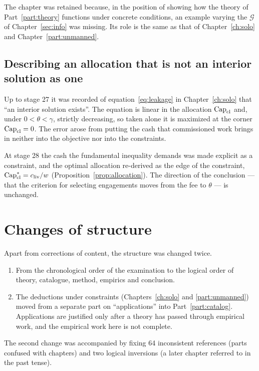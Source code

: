 The chapter was retained because, in the position of showing how the theory of
Part~\ref{part:theory} functions under concrete conditions, an example varying the $\mathcal{G}$ of
Chapter~\ref{sec:info} was missing. Its role is the same as that of Chapter~\ref{ch:solo} and
Chapter~\ref{part:unmanned}.

\subsection{Describing an allocation that is not an interior solution as one}
\label{sec:rev-interior}

Up to stage 27 it was recorded of equation~\eqref{eq:leakage} in Chapter~\ref{ch:solo} that ``an
interior solution exists''. The equation is linear in the allocation $\mathrm{Cap}_{\mathrm{cl}}$ and, under
$0<\theta<\gamma$, strictly decreasing, so taken alone it is maximized at the corner $\mathrm{Cap}_{\mathrm{cl}}=0$. The
error arose from putting the cash that commissioned work brings in neither into the objective nor
into the constraints.

At stage 28 the cash the fundamental inequality demands was made explicit as a constraint, and the
optimal allocation re-derived as the edge of the constraint,
$\mathrm{Cap}_{\mathrm{cl}}^\ast=c_{\rm liv}/w$ (Proposition~\ref{prop:allocation}). The direction of the conclusion —
that the criterion for selecting engagements moves from the fee to $\theta$ — is unchanged.

\section{Changes of structure}

Apart from corrections of content, the structure was changed twice.

\begin{enumerate}[label=(\arabic*)]
\item From the chronological order of the examination to the logical order of theory, catalogue,
method, empirics and conclusion.
\item The deductions under constraints (Chapters~\ref{ch:solo} and \ref{part:unmanned}) moved from
a separate part on ``applications'' into Part~\ref{part:catalog}. Applications are justified only
after a theory has passed through empirical work, and the empirical work here is not complete.
\end{enumerate}

The second change was accompanied by fixing 64 inconsistent references (parts confused with
chapters) and two logical inversions (a later chapter referred to in the past tense).
